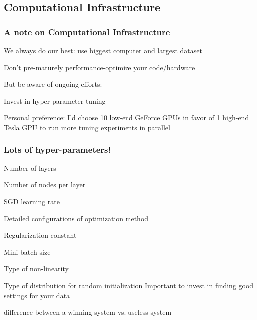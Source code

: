 %
%


\subsection[Infrastructure]{Computational Infrastructure}

\begin{frame}
\frametitle{A note on Computational Infrastructure}
\bi
\pause
\item We always do our best: use biggest computer and largest dataset
\pause 
\item Don't pre-maturely performance-optimize your code/hardware
	\bi
	\item But be aware of ongoing efforts: \cite{coates13cots,dean12distributed} %
	\ei
\pause
\item Invest in hyper-parameter tuning
	\bi
	\item Personal preference: I'd choose 10 low-end GeForce GPUs in favor of 1 high-end Tesla GPU to run more tuning experiments in parallel
	\ei
\ei
\end{frame}

\begin{frame}
\frametitle{Lots of hyper-parameters!}
\be
\item Number of layers
\item Number of nodes per layer
\item SGD learning rate
\item Detailed configurations of optimization method
\item Regularization constant
\item Mini-batch size
\item Type of non-linearity
\item Type of distribution for random initialization
\ee
\vspace{1cm}
Important to invest in finding good settings for {\color{red} your data}
\bi
        \item difference between a winning system vs. useless system
\ei
\end{frame}

